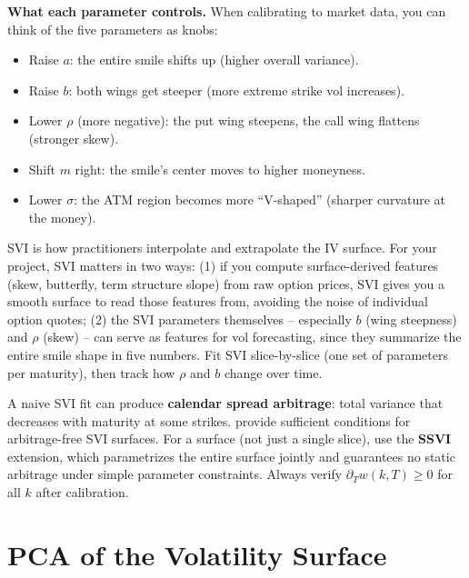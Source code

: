\textbf{What each parameter controls.}
When calibrating to market data, you can think of the five parameters as knobs:
\begin{itemize}[nosep]
  \item Raise $a$: the entire smile shifts up (higher overall variance).
  \item Raise $b$: both wings get steeper (more extreme strike vol increases).
  \item Lower $\rho$ (more negative): the put wing steepens, the call wing flattens (stronger skew).
  \item Shift $m$ right: the smile's center moves to higher moneyness.
  \item Lower $\sigma$: the ATM region becomes more ``V-shaped'' (sharper curvature at the money).
\end{itemize}

\begin{projectconnection}
SVI is how practitioners interpolate and extrapolate the IV surface.
For your project, SVI matters in two ways:
(1) if you compute surface-derived features (skew, butterfly, term structure slope) from raw option prices, SVI gives you a smooth surface to read those features from, avoiding the noise of individual option quotes;
(2) the SVI parameters themselves -- especially $b$ (wing steepness) and $\rho$ (skew) -- can serve as features for vol forecasting, since they summarize the entire smile shape in five numbers.
Fit SVI slice-by-slice (one set of parameters per maturity), then track how $\rho$ and $b$ change over time.
\end{projectconnection}

\begin{warning}
A naive SVI fit can produce \textbf{calendar spread arbitrage}: total variance that decreases with maturity at some strikes.
\citet{GatheralJacquier2014} provide sufficient conditions for arbitrage-free SVI surfaces.
For a surface (not just a single slice), use the \textbf{SSVI} extension, which parametrizes the entire surface jointly and guarantees no static arbitrage under simple parameter constraints.
Always verify $\partial_T w(k,T) \geq 0$ for all $k$ after calibration.
\end{warning}


\section{PCA of the Volatility Surface}
\label{sec:pca-iv-surface}

